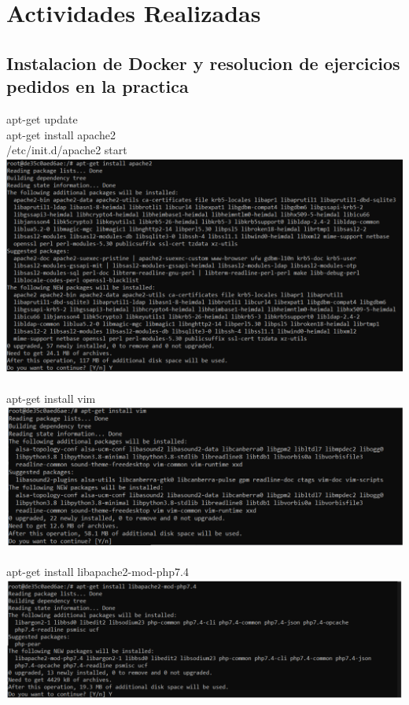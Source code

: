 \documentclass{article}
\begin{document}
\section{Actividades Realizadas}

\subsection{Instalacion de Docker y resolucion de ejercicios pedidos en la practica\\}



apt-get update\\
apt-get install apache2\\
/etc/init.d/apache2 start\\
\includegraphics[width=\textwidth]{img/c1.png}
\\
\\
apt-get install vim\\
\includegraphics[width=\textwidth]{img/c2.png}
\\
\\
apt-get install libapache2-mod-php7.4\\
\includegraphics[width=\textwidth]{img/c3.png}
\end{document}
